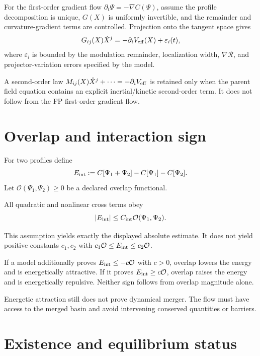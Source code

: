 \documentclass[11pt]{article}
\begin{document}
\begin{theorem}\label{thm:modulation}
For the first-order gradient flow $\partial_t\Psi=-\nabla C(\Psi)$, assume the
profile decomposition is unique, $G(X)$ is uniformly invertible, and the
remainder and curvature-gradient terms are controlled. Projection onto the
tangent space gives
\[
G_{ij}(X)\dot X^j=-\partial_iV_{\rm eff}(X)+\varepsilon_i(t),
\]
where $\varepsilon_i$ is bounded by the modulation remainder, localization
width, $\nabla\mathcal R$, and projector-variation errors specified by the
model.
\end{theorem}

A second-order law
$M_{ij}(X)\ddot X^j+\cdots=-\partial_iV_{\rm eff}$ is retained only when the
parent field equation contains an explicit inertial/kinetic second-order term.
It does not follow from the FP first-order gradient flow.

\section{Overlap and interaction sign}

For two profiles define
\[
E_{\rm int}:=C[\Psi_1+\Psi_2]-C[\Psi_1]-C[\Psi_2].
\]
Let $\mathcal O(\Psi_1,\Psi_2)\ge0$ be a declared overlap functional.

\begin{assumption}\label{ass:cross}
All quadratic and nonlinear cross terms obey
\[
|E_{\rm int}|\le C_{\rm int}\mathcal O(\Psi_1,\Psi_2).
\]
\end{assumption}

This assumption yields exactly the displayed absolute estimate. It does not
yield positive constants $c_1,c_2$ with
$c_1\mathcal O\le E_{\rm int}\le c_2\mathcal O$.

\begin{theorem}\label{thm:sign}
If a model additionally proves
$E_{\rm int}\le-c\mathcal O$ with $c>0$, overlap lowers the energy and is
energetically attractive. If it proves
$E_{\rm int}\ge c\mathcal O$, overlap raises the energy and is energetically
repulsive. Neither sign follows from overlap magnitude alone.
\end{theorem}

Energetic attraction still does not prove dynamical merger. The flow must have
access to the merged basin and avoid intervening conserved quantities or
barriers.

\section{Existence and equilibrium status}
\end{document}
